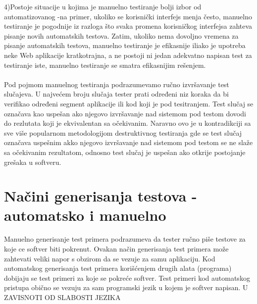 \documentclass[12pt,oneside]{memoir}
\begin{document}
4)Postoje  situacije  u  kojima  je  manuelno  testiranje  bolji  izbor  od  automatizovanog -na primer, ukoliko se korisnički interfejs menja često,  manuelno  testiranje  je  pogodnije  iz  razloga što  svaka  promena  korisničkog  interfejsa  zahteva  pisanje  novih  automatskih  testova.  Zatim, ukoliko 
nema dovoljno vremena za pisanje automatskih testova, manuelno testiranje je efikasnije iliako je upotreba neke Web aplikacije kratkotrajna, a ne postoji ni
jedan adekvatno napisan test 
za testiranje iste, manuelno testiranje se smatra efikasnijim rešenjem. \\ \\
Pod pojmom manuelnog testiranja podrazumevamo ručno izvršavanje test slučajeva. U najvećem broju
slučaja tester prati određeni niz koraka da bi verifikao određeni segment aplikacije ili kod koji je pod
tesitranjem.
Test slučaj se označava kao uspešan ako njegovo izvršavanje nad sistemom pod testom dovodi do rezlutata
koji je ekvivalentan sa očekivanim. Naravno ovo je u kontradikciji sa sve više popularnom metodologijom
destruktivnog testiranja gde se test slučaj označava uspešnim akko njegovo izvršavanje nad sistemom pod
testom se ne slaže sa očekivanim rezultatom, odnosno test slučaj je uspešan ako otkrije postojanje grešaka u
softveru.
\section{Načini generisanja testova - automatsko i manuelno} \label{broj5}
Manuelno generisanje test primera podrazumeva da tester ručno piše testove za koje ce softver biti pokrenut. Ovakan način generisanja test primera može zahtevati veliki napor s obzirom da se vezuje za samu aplikaciju. Kod automatskog generisanja test primera korišćenjem drugih alata (programa) dobijaju se test primeri za koje se pokreće softver. 
Test primeri kod automatskog pristupa obično se vezuju za sam programski jezik u kojem je softver napisan. U ZAVISNOTI OD SLABOSTI JEZIKA
\end{document}
